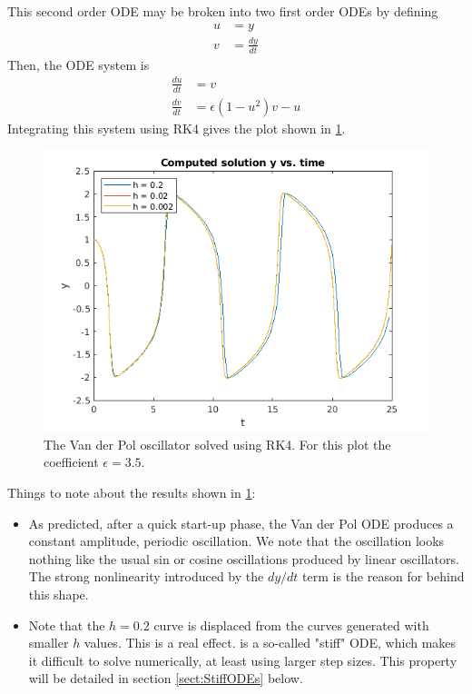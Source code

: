 \documentclass[hidelinks,notitlepage]{book}
\begin{document}
This second order ODE may be broken into two first order ODEs by defining
\begin{align}
\nonumber
u &=  y \\
\nonumber
v &= \frac{d y}{d t}
\end{align}
Then, the ODE system is  
\begin{align}
\nonumber
\frac{d u}{d t } &= v \\
\nonumber
\frac{d v}{d t} &= \epsilon(1 - u^2) v - u
\end{align}
Integrating this system using RK4 gives the plot shown in \cref{fig:RK4VanDerPol}.  
\begin{figure}[tbh]
	\centering
	\includegraphics[width=0.7\columnwidth]{RK4VanDerPol.png}
	\caption{The Van der Pol oscillator solved using RK4.  For this plot the coefficient $\epsilon = 3.5$.  }
	\label{fig:RK4VanDerPol}
\end{figure}
Things to note about the results shown in \cref{fig:RK4VanDerPol}:
\begin{itemize}
	\item As predicted, after a quick start-up phase, the Van der Pol ODE produces a constant amplitude, periodic oscillation.  We note that the oscillation looks nothing like the usual sin or cosine oscillations produced by linear oscillators.  The strong nonlinearity introduced by the $dy/dt$ term is the reason for behind this shape.
	\item Note that the $h=0.2$ curve is displaced from the curves generated with smaller $h$ values.  This is a real effect.   is a so-called "stiff" ODE, which makes it difficult to solve numerically, at least using larger step sizes.  This property will be detailed in section \cref{sect:StiffODEs} below.
\end{itemize}
\end{document}
